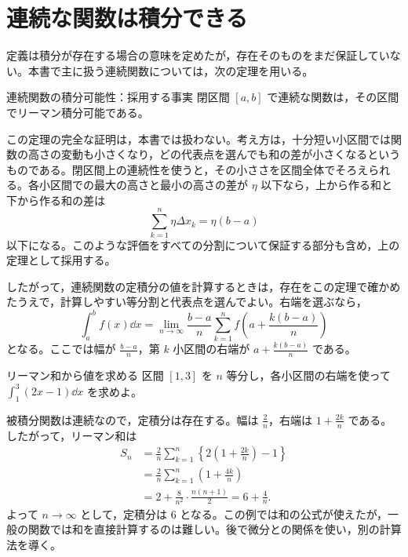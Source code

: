 \section{連続な関数は積分できる}\label{節:積分可能性}
定義は積分が存在する場合の意味を定めたが，存在そのものをまだ保証していない。本書で主に扱う連続関数については，次の定理を用いる。

\begin{theorem}{連続関数の積分可能性：採用する事実}\label{定理:連続積分可能}
閉区間 $[a,b]$ で連続な関数は，その区間でリーマン積分可能である。
\end{theorem}

この定理の完全な証明は，本書では扱わない。考え方は，十分短い小区間では関数の高さの変動も小さくなり，どの代表点を選んでも和の差が小さくなるというものである。閉区間上の連続性を使うと，その小ささを区間全体でそろえられる。各小区間での最大の高さと最小の高さの差が $\eta$ 以下なら，上から作る和と下から作る和の差は
\[
 \sum_{k=1}^{n}\eta\Delta x_k=\eta(b-a)
\]
以下になる。このような評価をすべての分割について保証する部分も含め，上の定理として採用する。

したがって，連続関数の定積分の値を計算するときは，存在をこの定理で確かめたうえで，計算しやすい等分割と代表点を選んでよい。右端を選ぶなら，
\[
 \int_a^b f(x)\dd x
 =\lim_{n\to\infty}\frac{b-a}{n}
  \sum_{k=1}^{n}f\left(a+\frac{k(b-a)}n\right)
\]
となる。ここでは幅が $\frac{b-a}{n}$，第 $k$ 小区間の右端が $a+\frac{k(b-a)}n$ である。

\begin{example}{リーマン和から値を求める}
区間 $[1,3]$ を $n$ 等分し，各小区間の右端を使って $\int_1^3(2x-1)\dd x$ を求めよ。
\end{example}
被積分関数は連続なので，定積分は存在する。幅は $\frac2n$，右端は $1+\frac{2k}{n}$ である。したがって，リーマン和は
\begin{align*}
 S_n
 &=\frac2n\sum_{k=1}^{n}\left\{2\left(1+\frac{2k}n\right)-1\right\}\\
 &=\frac2n\sum_{k=1}^{n}\left(1+\frac{4k}n\right)\\
 &=2+\frac8{n^2}\cdot\frac{n(n+1)}2
  =6+\frac4n.
\end{align*}
よって $n\to\infty$ として，定積分は $6$ となる。この例では和の公式が使えたが，一般の関数では和を直接計算するのは難しい。後で微分との関係を使い，別の計算法を導く。

